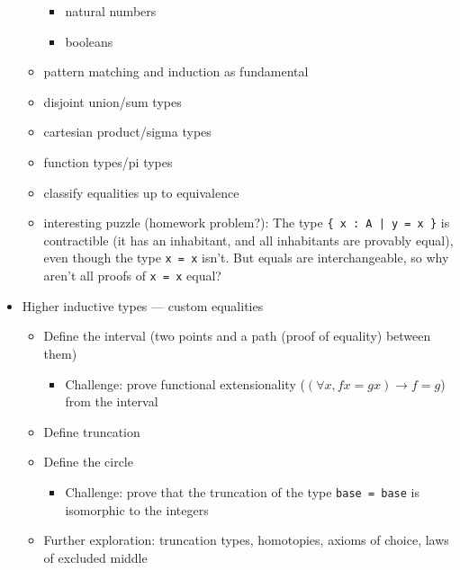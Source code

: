 \documentclass{article}
\begin{document}
\begin{itemize}
\begin{itemize}
\begin{itemize}
        \item natural numbers
        \item booleans
      \end{itemize}
      \item pattern matching and induction as fundamental
      \item disjoint union/sum types
      \item cartesian product/sigma types
      \item function types/pi types
      \item classify equalities up to equivalence
      \item interesting puzzle (homework problem?): The type \texttt{\{ x : A | y = x \}} is contractible (it has an inhabitant, and all inhabitants are provably equal), even though the type \texttt{x = x} isn't.  But equals are interchangeable, so why aren't all proofs of \texttt{x = x} equal?
    \end{itemize}
    \item Higher inductive types --- custom equalities
    \begin{itemize}
      \item Define the interval (two points and a path (proof of equality) between them)
      \begin{itemize}
        \item Challenge: prove functional extensionality ($(\forall x, f x = g x) \to f = g$) from the interval
      \end{itemize}
      \item Define truncation
      \item Define the circle
      \begin{itemize}
        \item Challenge: prove that the truncation of the type \texttt{base = base} is isomorphic to the integers
      \end{itemize}
      \item Further exploration: truncation types, homotopies, axioms of choice, laws of excluded middle
  \end{itemize}
\end{itemize}
\clearpage
\end{document}
